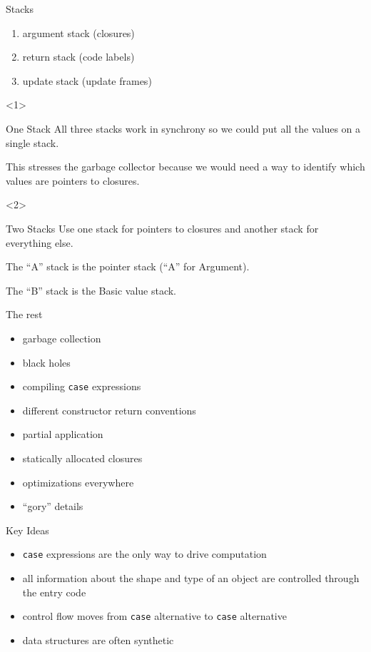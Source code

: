 \documentclass{beamer}
\begin{document}
\begin{frame}{Stacks}
  \begin{enumerate}
  \item argument stack (closures)
  \item return stack (code labels)
  \item update stack (update frames)
  \end{enumerate}

  \begin{onlyenv}<1>
    \begin{block}{One Stack}
      All three stacks work in synchrony so we could put all the values on a
      single stack.

      This stresses the garbage collector because we would need a way to
      identify which values are pointers to closures.
    \end{block}
  \end{onlyenv}

  \begin{onlyenv}<2>
    \begin{block}{Two Stacks}
      Use one stack for pointers to closures and another stack for everything
      else.

      The ``A'' stack is the pointer stack (``A'' for Argument).

      The ``B'' stack is the Basic value stack.
    \end{block}
  \end{onlyenv}
\end{frame}

\begin{frame}{The rest}
  \begin{itemize}
  \item garbage collection
  \item black holes
  \item compiling \texttt{case} expressions
  \item different constructor return conventions
  \item partial application
  \item statically allocated closures
  \item optimizations everywhere
  \item ``gory'' details
  \end{itemize}
\end{frame}

\begin{frame}{Key Ideas}
  \begin{itemize}
  \item<1-> \texttt{case} expressions are the only way to drive computation
  \item<2-> all information about the shape and type of an object are controlled
    through the entry code
  \item<3-> control flow moves from \texttt{case} alternative to \texttt{case}
    alternative
  \item<4-> data structures are often synthetic
  \end{itemize}
\end{frame}
\end{document}
